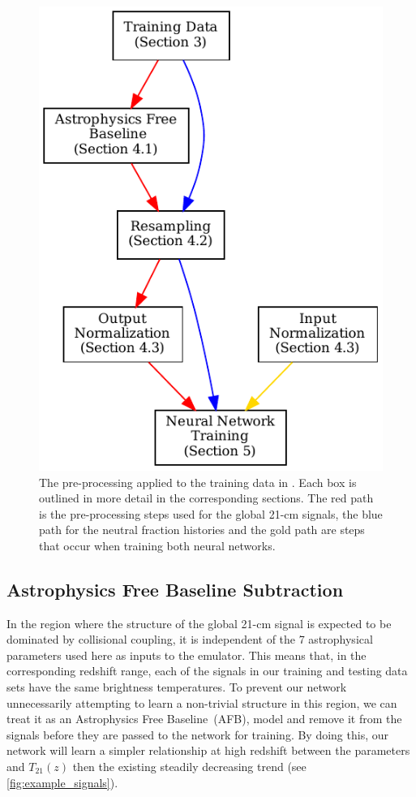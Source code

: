 \begin{figure}
    \centering
    \includegraphics{globalemu/figs/flowchart.pdf}
    \caption{The pre-processing applied to the training data in \name. Each box is outlined in more detail in the corresponding sections. The red path is the pre-processing steps used for the global 21-cm signals, the blue path for the neutral fraction histories and the gold path are steps that occur when training both neural networks.}
    \label{fig:flow}
\end{figure}

\subsection{Astrophysics Free Baseline Subtraction}
\label{sec:afb}

In the region where the structure of the global 21-cm signal is expected to be dominated by collisional coupling, it is independent of the 7 astrophysical parameters used here as inputs to the emulator. This means that, in the corresponding redshift range, each of the signals in our training and testing data sets have the same brightness temperatures. To prevent our network unnecessarily attempting to learn a non-trivial structure in this region, we can treat it as an Astrophysics Free Baseline~(AFB), model and remove it from the signals before they are passed to the network for training. By doing this, our network will learn a simpler relationship at high redshift between the parameters and $T_{21}(z)$ then the existing steadily decreasing trend (see \cref{fig:example_signals}).

